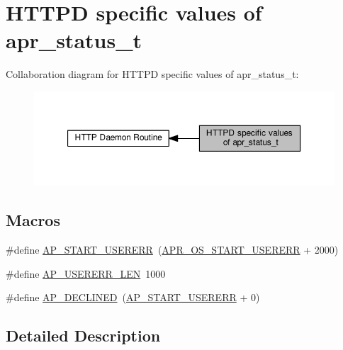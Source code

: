 \hypertarget{group__APACHE__APR__STATUS__T}{}\section{H\+T\+T\+PD specific values of apr\+\_\+status\+\_\+t}
\label{group__APACHE__APR__STATUS__T}
Collaboration diagram for H\+T\+T\+PD specific values of apr\+\_\+status\+\_\+t\+:
\nopagebreak
\begin{figure}[H]
\begin{center}
\leavevmode
\includegraphics[width=350pt]{group__APACHE__APR__STATUS__T}
\end{center}
\end{figure}
\subsection*{Macros}
\begin{DoxyCompactItemize}
\item 
\#define \hyperlink{group__APACHE__APR__STATUS__T_gabc1b4115a47400f6807250f594f7d731}{A\+P\+\_\+\+S\+T\+A\+R\+T\+\_\+\+U\+S\+E\+R\+E\+RR}~(\hyperlink{group__apr__errno_gacd35b2de1e38a1fa4717e38d5e153571}{A\+P\+R\+\_\+\+O\+S\+\_\+\+S\+T\+A\+R\+T\+\_\+\+U\+S\+E\+R\+E\+RR} + 2000)
\item 
\#define \hyperlink{group__APACHE__APR__STATUS__T_gaafa0bf786fd2e77e9d0ccd3f14c859d1}{A\+P\+\_\+\+U\+S\+E\+R\+E\+R\+R\+\_\+\+L\+EN}~1000
\item 
\#define \hyperlink{group__APACHE__APR__STATUS__T_gab9f17ee05fd266f6293ea11ee9bef1a5}{A\+P\+\_\+\+D\+E\+C\+L\+I\+N\+ED}~(\hyperlink{group__APACHE__APR__STATUS__T_gabc1b4115a47400f6807250f594f7d731}{A\+P\+\_\+\+S\+T\+A\+R\+T\+\_\+\+U\+S\+E\+R\+E\+RR} + 0)
\end{DoxyCompactItemize}


\subsection{Detailed Description}


